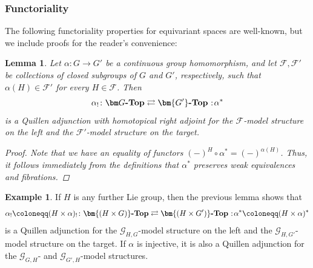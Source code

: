 \documentclass[reqno]{memo-l}
\theoremstyle{mythm}
\newtheorem{lemma}[thm]{Lemma}
\theoremstyle{definition}
\newtheorem{ex}[thm]{Example}
\numberwithin{equation}{section}
\newcommand{\Ff}{{\mathcal{F}}}
\newcommand{\cat}[1]{\textbf{\textup{#1}}}
\newcommand\noloc{%
	\nobreak
	\mspace{6mu plus 1mu}
	{:}
	\nonscript\mkern-\thinmuskip
	\mathpunct{}
	\mspace{2mu}
}
\begin{document}
\subsubsection{Functoriality} The following functoriality properties for equivariant spaces are well-known, but we include proofs for the reader's convenience:

\begin{lemma}\label{lemma:restr-equiv-rQ}
    Let $\alpha\colon G\to G'$ be a continuous group homomorphism, and let $\Ff,\Ff'$ be collections of closed subgroups of $G$ and $G'$, respectively, such that $\alpha(H)\in\Ff'$ for every $H\in\Ff$. Then 
    \[
        \alpha_!\colon\cat{$\bm G$-Top}\rightleftarrows\cat{$\bm{G'}$-Top}\noloc\alpha^*
    \]
    is a Quillen adjunction with homotopical right adjoint for the $\Ff$-model structure on the left and the $\Ff'$-model structure on the target.
    \begin{proof}
        Note that we have an equality of functors $(-)^H\circ\alpha^*=(-)^{\alpha(H)}$. Thus, it follows immediately from the definitions that $\alpha^*$ preserves weak equivalences and fibrations.
    \end{proof}
\end{lemma}

\begin{ex}\label{ex:graph-restr-rQ}
    If $H$ is any further Lie group, then the previous lemma shows that
    \[
        \alpha_!\coloneqq(H\times\alpha)_!\colon\cat{$\bm{(H\times G)}$-Top}\rightleftarrows\cat{$\bm{(H\times G')}$-Top}\noloc\alpha^*\coloneqq(H\times\alpha)^*
    \]
    is a Quillen adjunction for the $\mathcal G_{H,G}$-model structure on the left and the $\mathcal G_{H,G'}$-model structure on the target. If $\alpha$ is injective, it is also a Quillen adjunction for the $\mathcal G_{G,H}$- and $\mathcal G_{G',H}$-model structures.
\end{ex}
\end{document}
